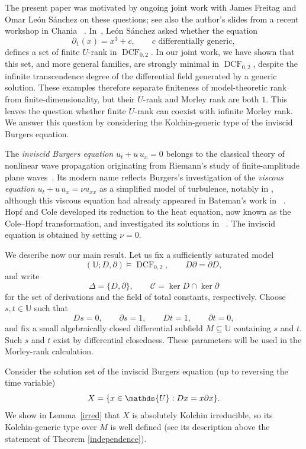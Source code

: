 \documentclass[11pt,a4paper]{amsart}
\theoremstyle{definition}
\newcommand{\DCF}{\operatorname{DCF}}
\newcommand{\Ucal}{{\mathds{U}}}
\newcommand{\C}{\mathcal C}
\begin{document}
The present paper was motivated by ongoing joint work with James
Freitag and Omar Le\'on S\'anchez on these questions; see also
the author's slides from a recent workshop in Chania  ~\cite{Chania}. In~\cite{LS}, Le\'on S\'anchez
asked whether the equation
\[
 \partial_1(x)=x^3+c,
 \qquad c\text{ differentially generic},
\]
defines a set of finite $U$-rank in $\DCF_{0,2}$. In our joint work,
we have shown that this set, and more general families, are
strongly minimal in $\DCF_{0,2}$, despite the infinite
transcendence degree of the differential field generated by a
generic solution. These examples therefore separate finiteness
of model-theoretic rank from finite-dimensionality, but their
$U$-rank and Morley rank are both $1$. This leaves the question
whether finite $U$-rank can coexist with infinite Morley rank. We answer this
question by considering the Kolchin-generic type of the inviscid
Burgers equation.

The \emph{inviscid Burgers equation} $u_t+u\,u_x=0$ belongs to the classical theory of nonlinear wave
propagation originating from Riemann's study of
finite-amplitude plane waves~\cite{Riemann1860}. Its modern name
reflects Burgers's investigation of the \emph{viscous equation}
$u_t+u\,u_x=\nu u_{xx}$ as a simplified model of turbulence,
notably in \cite{Burgers1948}, although this viscous
equation had already appeared in Bateman's work in
~\cite{Bateman1915}. Hopf and Cole developed
its reduction to the heat equation, now known as the Cole--Hopf
transformation, and investigated its solutions in ~\cite{Hopf1950,Cole1951}. The inviscid equation is
obtained by setting $\nu=0$.

We describe now our main result. Let us fix a sufficiently
saturated model
\[
 (\Ucal;D,\partial)\models\DCF_{0,2},
 \qquad D\partial=\partial D,
\]
and write
\[
 \Delta=\{D,\partial\},
 \qquad
 \C=\ker D\cap\ker\partial
\]
for the set of derivations and the field of total constants,
respectively. Choose $s,t\in\Ucal$ such that
\[
 Ds=0,\qquad \partial s=1,\qquad
 Dt=1,\qquad \partial t=0,
\]
and fix a small algebraically closed differential subfield
$M\subseteq\Ucal$ containing $s$ and $t$. Such $s$ and $t$ exist by
differential closedness. These parameters will be used in the
Morley-rank calculation.

Consider the solution set of the inviscid Burgers equation (up to reversing the time
variable)
\begin{equation}\label{burgers}
 X=\{x\in\Ucal: Dx=x\partial x\}.
 \notag
\end{equation}
We show in Lemma~\ref{irred} that $X$ is absolutely
Kolchin irreducible, so its Kolchin-generic type over $M$ is
well defined (see its description above the statement of Theorem \ref{independence}).
\end{document}
